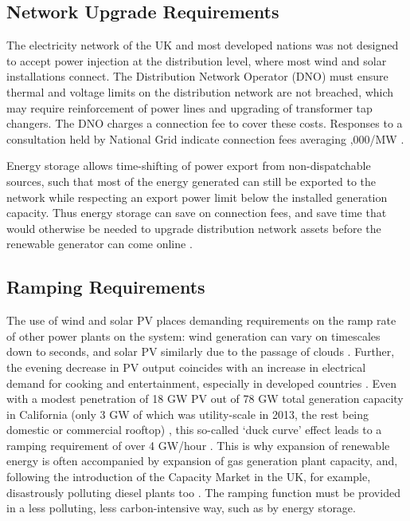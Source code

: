 \documentclass[report_18month.tex]{subfiles}
\begin{document}
\subsection{Network Upgrade Requirements}
\label{sec:Network Upgrade Requirements}
The electricity network of the UK and most developed nations was not designed to accept power injection at the distribution level, where most wind and solar installations connect. The Distribution Network Operator (DNO) must ensure thermal and voltage limits on the distribution network are not breached, which may require reinforcement of power lines and upgrading of transformer tap changers. \cite{glover2016power} The DNO charges a connection fee to cover these costs. Responses to a consultation held by National Grid indicate connection fees averaging ,000/MW \cite{natgrid2013consult}.

Energy storage allows time-shifting of power export from non-dispatchable sources, such that most of the energy generated can still be exported to the network while respecting an export power limit below the installed generation capacity. Thus energy storage can save on connection fees, and save time that would otherwise be needed to upgrade distribution network assets before the renewable generator can come online \cite{howison2017sse}.

\subsection{Ramping Requirements}
The use of wind and solar PV places demanding requirements on the ramp rate of other power plants on the system: wind generation can vary on timescales down to seconds, and solar PV similarly due to the passage of clouds \cite{kirby2004frequency}. Further, the evening decrease in PV output coincides with an increase in electrical demand for cooking and entertainment, especially in developed countries \cite{kirby2004frequency}. Even with a modest penetration of 18 GW PV out of 78 GW total generation capacity in California (only 3 GW of which was utility-scale in 2013, the rest being domestic or commercial rooftop) \cite{cec2016california}, this so-called `duck curve' effect leads to a ramping requirement of over 4 GW/hour \cite{denholm2015duck}. This is why expansion of renewable energy is often accompanied by expansion of gas generation plant capacity, and, following the introduction of the Capacity Market in the UK, for example, disastrously polluting diesel plants too \cite{mattholie2017cm}. The ramping function must be provided in a less polluting, less carbon-intensive way, such as by energy storage.
\end{document}
